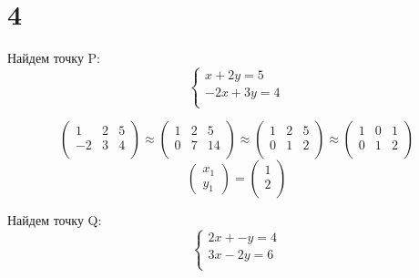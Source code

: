 \documentclass[a4paper]{article}
\begin{document}
\section*{4}

Найдем точку P:
\begin{equation*}
 \begin{cases}
  x + 2y = 5\\
  -2x + 3y = 4\\
 \end{cases}
\end{equation*}

\begin{equation*}
   \left(\begin{array}{rr|r}
   1 & 2& 5\\ 
   -2 & 3 & 4\\
   \end{array}\right)
\approx
   \left(\begin{array}{rr|r}
   1 & 2& 5\\ 
   0 & 7 & 14\\
   \end{array}\right)
  \approx
     \left(\begin{array}{rr|r}
   1 & 2& 5\\ 
   0 & 1 & 2\\
   \end{array}\right)
  \approx
       \left(\begin{array}{rr|r}
   1 & 0& 1\\ 
   0 & 1 & 2\\
   \end{array}\right)
\end{equation*}
\begin{equation*}
     \left(\begin{array}{rr|r}
   x_1\\
   y_1
   \end{array}\right)
  =
       \left(\begin{array}{rr|r}
    1\\ 
    2\\
   \end{array}\right)
\end{equation*}

Найдем точку Q:
\begin{equation*}
 \begin{cases}
  2x + -y = 4\\
  3x - 2y = 6\\
 \end{cases}
\end{equation*}
\end{document}
